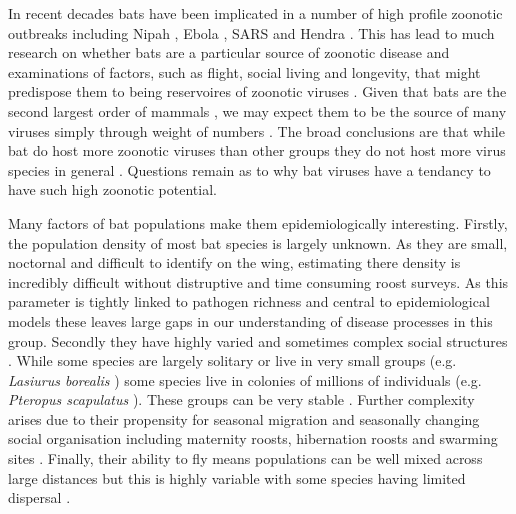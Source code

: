 In recent decades bats have been implicated in a number of high profile zoonotic outbreaks including Nipah \cite{field2001natural}, Ebola \cite{leroy2005fruit}, SARS \cite{li2005bats} and Hendra \cite{field2001natural}.
This has lead to much research on whether bats are a particular source of zoonotic disease \cite{luis2013comparison, olival2015bats, wang2011mass} and examinations of factors, such as flight, social living and longevity, that might predispose them to being reservoires of zoonotic viruses \cite{calisher2006bats, o2014bat, dobson2005links, racey2015uniqueness}.
Given that bats are the second largest order of mammals \cite{wilson2005mammal}, we may expect them to be the source of many viruses simply through weight of numbers \cite{luis2013comparison}.
The broad conclusions are that while bat do host more zoonotic viruses than other groups \cite{luis2013comparison} they do not host more virus species in general \cite{olival2015bats}.
Questions remain as to why bat viruses have a tendancy to have such high zoonotic potential.

Many factors of bat populations make them epidemiologically interesting.
Firstly, the population density of most bat species is largely unknown.
As they are small, noctornal and difficult to identify on the wing, estimating there density is incredibly difficult without distruptive and time consuming roost surveys.
As this parameter is tightly linked to pathogen richness \cite{kamiya2014determines} and central to epidemiological models \cite{may1979population, anderson1979population} these leaves large gaps in our understanding of disease processes in this group.
Secondly they have highly varied and sometimes complex social structures \cite{kerth2008causes}.
While some species are largely solitary or live in very small groups (e.g. \emph{Lasiurus borealis} \cite{shump1982lasiurus}) some species live in colonies of millions of individuals (e.g. \emph{Pteropus scapulatus} \cite{birt2008little}).
These groups can be very stable \cite{kerth2011bats, mccracken1981social}.
Further complexity arises due to their propensity for seasonal migration \cite{fleming2003ecology, richter2008first, cryan2014continental} and seasonally changing social organisation including maternity roosts, hibernation roosts and swarming sites \cite{kerth2008causes}.
Finally, their ability to fly means populations can be well mixed across large distances \cite{peel2013continent, petit1999male} but this is highly variable with some species having limited dispersal \cite{wilmer1994extreme}.




